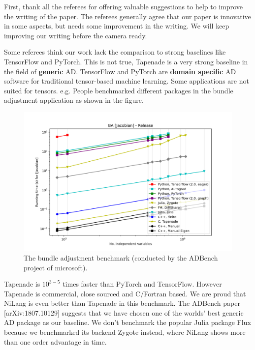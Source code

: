 \documentclass{article}
\begin{document}
First, thank all the referees for offering valuable suggestions to help to improve the writing of the paper.
The referees generally agree that our paper is innovative in some aspects, but needs some improvement in the writing.
We will keep improving our writing before the camera ready.

Some referees think our work lack the comparison to strong baselines like TensorFlow and PyTorch.
This is not true, Tapenade is a very strong baseline in the field of \textbf{generic} AD.
TensorFlow and PyTorch are \textbf{domain specific} AD software for traditional tensor-based machine learning.
Some applications are not suited for tensors.
e.g. People benchmarked different packages in the bundle adjustment application as shown in the figure.
\begin{figure}
    \centerline{\includegraphics[width=0.5\columnwidth,trim={0 1cm 1cm 1.7cm},clip]{ba-jacobian-adbench.png}}
    \caption{The bundle adjustment benchmark (conducted by the ADBench project of microsoft).}\label{bench-ba}
\end{figure}
Tapenade is $10^{3-5}$ times faster than PyTorch and TensorFlow. However Tapenade is commercial, close sourced and C/Fortran based.
We are proud that NiLang is even better than Tapenade in this benchmark.
The ADBench paper [arXiv:1807.10129] suggests that we have chosen one of the worlds' best generic AD package as our baseline.
We don't benchmark the popular Julia package Flux because we benchmarked its backend Zygote instead, where NiLang shows more than one order advantage in time.
\end{document}
